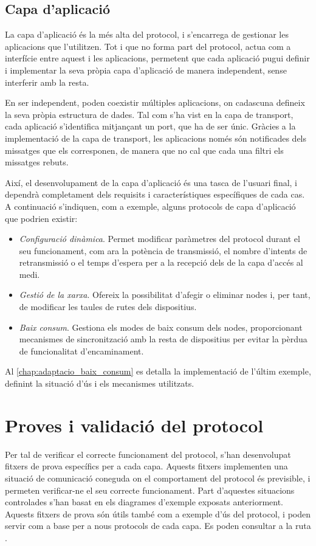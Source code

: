 \documentclass{tfgitic}[2024/07/01]
\begin{document}
{\subsection{Capa d’aplicació}
La capa d'aplicació és la més alta del protocol, i s'encarrega de gestionar les aplicacions que l'utilitzen. Tot i que no forma part del protocol, actua com a interfície entre aquest i les aplicacions, permetent que cada aplicació pugui definir i implementar la seva pròpia capa d'aplicació de manera independent, sense interferir amb la resta. 

En ser independent, poden coexistir múltiples aplicacions, on cadascuna defineix la seva pròpia estructura de dades. Tal com s'ha vist en la capa de transport, cada aplicació s'identifica mitjançant un port, que ha de ser únic. Gràcies a la implementació de la capa de transport, les aplicacions només són notificades dels missatges que els corresponen, de manera que no cal que cada una filtri els missatges rebuts.

Així, el desenvolupament de la capa d'aplicació és una tasca de l'usuari final, i dependrà completament dels requisits i característiques específiques de cada cas. A continuació s'indiquen, com a exemple, alguns protocols de capa d'aplicació que podrien existir:
\begin{itemize}
    \item \emph{Configuració dinàmica}. Permet modificar paràmetres del protocol durant el seu funcionament, com ara la potència de transmissió, el nombre d’intents de retransmissió o el temps d’espera per a la recepció dels  de la capa d’accés al medi.
    \item \emph{Gestió de la xarxa}. Ofereix la possibilitat d'afegir o eliminar nodes i, per tant, de modificar les taules de rutes dels dispositius.
    \item \emph{Baix consum}. Gestiona els modes de baix consum dels nodes, proporcionant mecanismes de sincronització amb la resta de dispositius per evitar la pèrdua de funcionalitat d’encaminament.
\end{itemize}

Al \autoref{chap:adaptacio_baix_consum} es detalla la implementació de l'últim exemple, definint la situació d'ús i els mecanismes utilitzats.

\section{Proves i validació del protocol}
Per tal de verificar el correcte funcionament del protocol, s'han desenvolupat fitxers de prova específics per a cada capa. Aquests fitxers implementen una situació de comunicació coneguda on el comportament del protocol és previsible, i permeten verificar-ne el seu correcte funcionament. Part d'aquestes situacions controlades s'han basat en els diagrames d'exemple exposats anteriorment. Aquests fitxers de prova són útils també com a exemple d'ús del protocol, i poden servir com a base per a nous protocols de cada capa. Es poden consultar a la ruta .

}
\end{document}

